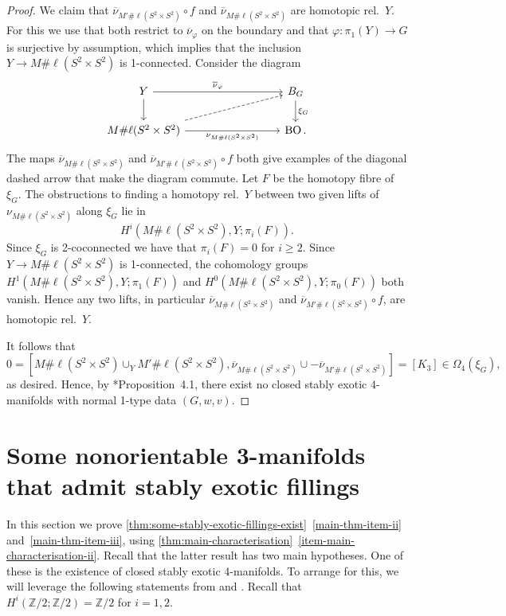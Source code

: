 \documentclass[a4paper, reqno]{amsart}
\theoremstyle{definition}
\theoremstyle{remark}
\newcommand{\Z}{\mathbb{Z}}
\newcommand{\ol}{\overline}
\DeclareMathOperator{\BO}{BO}
\begin{document}
\begin{proof}
We claim that $\ol{\nu}_{M' \# \ell(S^2 \times S^2)} \circ f$  and $\ol{\nu}_{M \# \ell(S^2 \times S^2)}$ are homotopic rel.\ $Y$.  For this we use that both restrict to $\ol{\nu}_\varphi$ on the boundary and that $\varphi \colon \pi_1(Y) \to G$ is surjective by assumption, which implies that the inclusion  $Y \to M \# \ell(S^2 \times S^2)$ is 1-connected. 
Consider the diagram
\[
\begin{tikzcd}[column sep = 3cm]
Y \ar[r,"\ol{\nu}_\varphi"] \ar[d] & B_G \ar[d,"\xi_G"]  \\ M \# \ell(S^2 \times S^2) \ar[r,"\nu_{M\# \ell(S^2 \times S^2)}"'] \ar[ur,dashed] & \BO.
\end{tikzcd}
\]
The maps $\ol{\nu}_{M \# \ell(S^2 \times S^2)}$ and $\ol{\nu}_{M' \# \ell(S^2 \times S^2)} \circ f$ both give examples of the diagonal dashed arrow that make the diagram commute. 
Let $F$ be the homotopy fibre of $\xi_G$. 
The obstructions to finding a homotopy rel.\ $Y$ between two given lifts of $\nu_{M \# \ell(S^2 \times S^2)}$ along $\xi_G$  lie in \[H^i(M\# \ell (S^2 \times S^2),Y; \pi_i(F)).\]  Since $\xi_G$ is 2-coconnected we have that $\pi_i(F)=0$ for $i \geq 2$. Since $Y \to  M \# \ell(S^2 \times S^2)$ is 1-connected,  the cohomology groups $H^1(M\# \ell (S^2 \times S^2),Y; \pi_1(F))$ and $H^0(M\# \ell (S^2 \times S^2),Y; \pi_0(F))$ both vanish. Hence any two lifts, in particular $\ol{\nu}_{M \# \ell(S^2 \times S^2)}$ and $\ol{\nu}_{M' \# \ell(S^2 \times S^2)} \circ f$, are homotopic rel.\ $Y$.

It follows that 
\[0 = [M \# \ell(S^2 \times S^2) \cup_Y M' \# \ell(S^2 \times S^2), \ol{\nu}_{M\# \ell(S^2 \times S^2)} \cup - \ol{\nu}_{M' \# \ell(S^2 \times S^2)}]=[K_3] \in \Omega_4(\xi_G),\] as desired.  Hence, by \cite{Kasprowski-Powell}*{Proposition~4.1},  there exist no closed stably exotic $4$-manifolds with normal 1-type data $(G,w,v)$. 
\end{proof}

\section{Some nonorientable 3-manifolds that admit stably exotic fillings}

In this section we prove \cref{thm:some-stably-exotic-fillings-exist}~\eqref{main-thm-item-ii} and~\eqref{main-thm-item-iii}, using \cref{thm:main-characterisation}~\eqref{item-main-characterisation-ii}. Recall that the latter result has two main hypotheses. One of these is the existence of closed stably exotic 4-manifolds. To arrange for this, we will leverage the following statements from \cite{Kreck84} and \cite{Kasprowski-Powell}. Recall that~$H^i(\Z/2;\Z/2) = \Z/2$ for $i=1,2$. 
\end{document}

